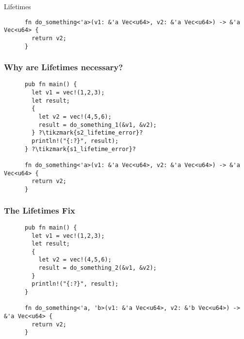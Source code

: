 \begin{section}{Lifetimes}
\begin{frame}[fragile]
\begin{verbatim}
      fn do_something<'a>(v1: &'a Vec<u64>, v2: &'a Vec<u64>) -> &'a Vec<u64> {
        return v2;
      }
    \end{verbatim}
  \end{frame}

  \begin{frame}[fragile]
    \frametitle{Why are Lifetimes necessary?}
    \begin{verbatim}
      pub fn main() {
        let v1 = vec!(1,2,3);
        let result;
        {
          let v2 = vec!(4,5,6);
          result = do_something_1(&v1, &v2);
        } ?\tikzmark{s2_lifetime_error}?
        println!("{:?}", result);
      } ?\tikzmark{s1_lifetime_error}?

      fn do_something<'a>(v1: &'a Vec<u64>, v2: &'a Vec<u64>) -> &'a Vec<u64> {
        return v2;
      }
    \end{verbatim}
  \end{frame}

  \begin{frame}[fragile]
    \frametitle{The Lifetimes Fix}
    \begin{verbatim}
      pub fn main() {
        let v1 = vec!(1,2,3);
        let result;
        {
          let v2 = vec!(4,5,6);
          result = do_something_2(&v1, &v2);
        }
        println!("{:?}", result);
      }

      fn do_something<'a, 'b>(v1: &'a Vec<u64>, v2: &'b Vec<u64>) -> &'a Vec<u64> {
        return v2;
      }
    \end{verbatim}
  \end{frame}

\end{section}
